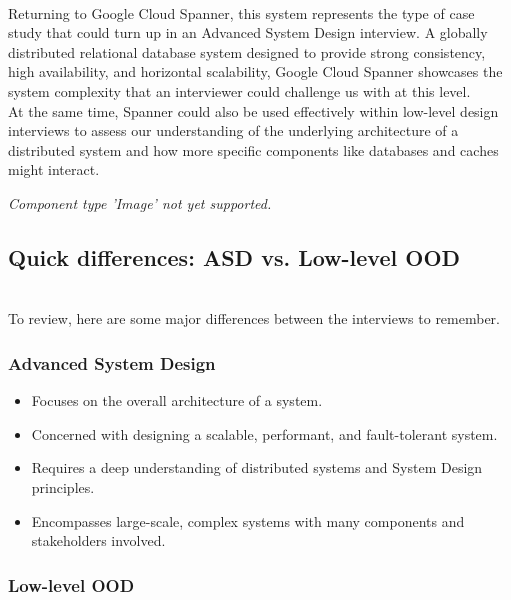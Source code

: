 \\
Returning to Google Cloud Spanner, this system represents the type of case study that could turn up in an Advanced System Design interview. A globally distributed relational database system designed to provide strong consistency, high availability, and horizontal scalability, Google Cloud Spanner showcases the system complexity that an interviewer could challenge us with at this level.
\\
At the same time, Spanner could also be used effectively within low-level design interviews to assess our understanding of the underlying architecture of a distributed system and how more specific components like databases and caches might interact.

\textit{Component type 'Image' not yet supported.}

\subsection{Quick differences: ASD vs. Low-level OOD}\label{BbT2thwHASWUNT7w5tXAy}
\\
To review, here are some major differences between the interviews to remember.

\subsubsection{Advanced System Design}\label{Hpwy7FBeIGKIIegySRjw1}

\begin{itemize}
\item
\protect{}\label{jMa3Q2igC7MgktghGiDHg}
Focuses on the overall architecture of a system.
\item
\protect{}\label{aLs7P-41GFTCEBh_OMrb-}
Concerned with designing a scalable, performant, and fault-tolerant system.
\item
\protect{}\label{TkL1FgGGjn7_JTp8KSSyh}
Requires a deep understanding of distributed systems and System Design principles.
\item
\protect{}\label{9NDs3MtpXn5MarRJc8XWd}
Encompasses large-scale, complex systems with many components and stakeholders involved.
\end{itemize}

\subsubsection{Low-level OOD}\label{HPAa4_bKHWTQuVtnIztL8}

